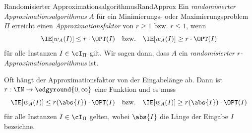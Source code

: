 \documentclass[language=ngerman,algolist]{TemplateLecture}
\begin{document}
\begin{defi}{Randomisierter Approximationsalgorithmus}{RandApprox}
    Ein \emph{randomisierter Approximationsalgorithmus} $A$ für ein Minimierungs- oder Maximierungsproblem $\Pi$ erreicht einen \emph{Approximationsfaktor} von $r \geq 1$ bzw. $r \leq 1$, wenn 
    \begin{equation*}
        \IE[w_A(I)] \leq r \cdot \OPT(I) \quad \text{bzw.} \quad \IE[w_A(I)] \geq r \cdot \OPT(I)
    \end{equation*}
    für alle Instanzen $I \in \cI_\Pi$ gilt. Wir sagen dann, dass $A$ ein \emph{randomisierter $r$-Approximationsalgorithmus} ist.
    
    Oft hängt der Approximationsfaktor von der Eingabelänge ab. Dann ist $r: \IN \to \edgyround{0,\infty}$ eine Funktion und es muss 
    \begin{equation*}
        \IE[w_A(I)] \leq r(\abs{I}) \cdot \OPT(I) \quad \text{bzw.} \quad \IE[w_A(I)] \geq r(\abs{I}) \cdot \OPT(I)
    \end{equation*}
    für alle Instanzen $I \in \cI_\Pi$ gelten, wobei $\abs{I}$ die Länge der Eingabe $I$ bezeichne.
\end{defi}
\end{document}
